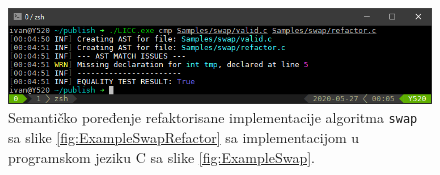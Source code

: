 \begin{figure}[h!]
\centering
\includegraphics[scale=0.8]{images/eval/cmp_refactor.png}
\caption{Semantičko poređenje refaktorisane implementacije algoritma \texttt{swap} sa slike \ref{fig:ExampleSwapRefactor} sa implementacijom u programskom jeziku C sa slike \ref{fig:ExampleSwap}.}
\label{fig:ExampleSwapCompareRefactor}
\end{figure}
